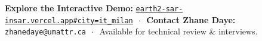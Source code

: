 \documentclass[9pt,letterpaper]{article}
\begin{document}
\vspace{-2pt}

\begin{tcolorbox}[colframe=iceyeblue,colback=iceyeblue,coltext=white,boxrule=0pt,top=4pt,bottom=4pt]
\centering\footnotesize
\textbf{Explore the Interactive Demo:} \href{https://earth2-sar-insar.vercel.app#city=it_milan&preset=sar_focus&stage=v3}{\texttt{earth2-sar-insar.vercel.app\#city=it\_milan}} $\,\cdot\,$ 
\textbf{Contact Zhane Daye:} \texttt{zhanedaye@umattr.ca} $\,\cdot\,$ Available for technical review \& interviews.
\end{tcolorbox}
\end{document}

